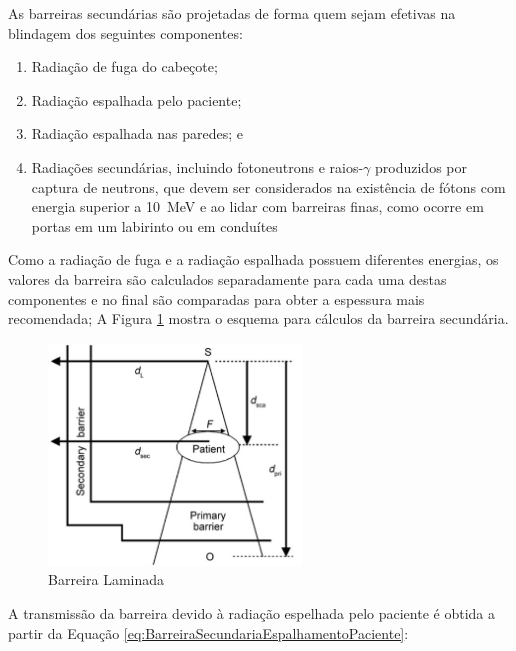 \documentclass[11pt,a4paper]{article}
\begin{document}
            As barreiras secundárias são projetadas de forma quem sejam efetivas na blindagem dos seguintes componentes:

                \begin{enumerate}
                    \item Radiação de fuga do cabeçote;
                    \item Radiação espalhada pelo paciente;
                    \item Radiação espalhada nas paredes; e 
                    \item Radiações secundárias, incluindo fotoneutrons e raios-$\gamma$ produzidos por captura de neutrons, que devem ser considerados na existência de fótons com energia superior a \qty{10}{MeV} e ao lidar com barreiras finas, como ocorre em portas em um labirinto ou em conduítes 
                \end{enumerate}

            Como a radiação de fuga e a radiação espalhada possuem diferentes energias, os valores da barreira são calculados separadamente para cada uma destas componentes e no final são comparadas para obter a espessura mais recomendada; A Figura \ref{fig:esquemaTransmissaoRadiacaoEspalhadaPaciente} mostra o esquema para cálculos da barreira secundária. 

            \begin{figure}[h]
                \centering
                \includegraphics[width=0.6\textwidth]{Imagens/esquemaTransmissaoRadiacaoEspalhadaPaciente.JPG}
                \caption{Barreira Laminada}
                \label{fig:esquemaTransmissaoRadiacaoEspalhadaPaciente}
            \end{figure}

            A transmissão da barreira devido à radiação espelhada pelo paciente é obtida a partir da Equação \ref{eq:BarreiraSecundariaEspalhamentoPaciente}: 
\end{document}

